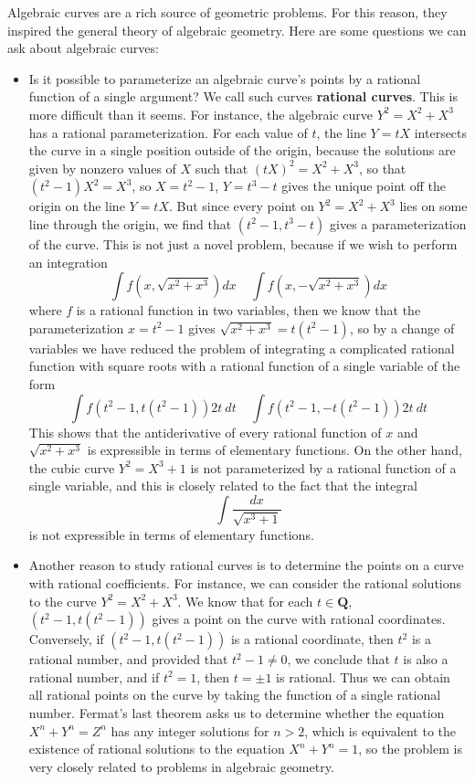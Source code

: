 Algebraic curves are a rich source of geometric problems. For this reason, they inspired the general theory of algebraic geometry. Here are some questions we can ask about algebraic curves:
%
\begin{itemize}
    \item Is it possible to parameterize an algebraic curve's points by a rational function of a single argument? We call such curves {\bf rational curves}. This is more difficult than it seems. For instance, the algebraic curve $Y^2 = X^2 + X^3$ has a rational parameterization. For each value of $t$, the line $Y = tX$ intersects the curve in a single position outside of the origin, because the solutions are given by nonzero values of $X$ such that $(tX)^2 = X^2 + X^3$, so that $(t^2 - 1)X^2 = X^3$, so $X = t^2 - 1$, $Y = t^3 - t$ gives the unique point off the origin on the line $Y = tX$. But since every point on $Y^2 = X^2 + X^3$ lies on some line through the origin, we find that $(t^2 - 1, t^3 - t)$ gives a parameterization of the curve. This is not just a novel problem, because if we wish to perform an integration
    \[ \int f \left(x, \sqrt{x^2 + x^3} \right) dx\ \ \ \ \ \int f \left( x, - \sqrt{x^2 + x^3} \right) dx \]
    where $f$ is a rational function in two variables, then we know that the parameterization $x = t^2 - 1$ gives $\sqrt{x^2 + x^3} = t(t^2-1)$, so by a change of variables we have reduced the problem of integrating a complicated rational function with square roots with a rational function of a single variable of the form
    \[ \int f(t^2 - 1, t(t^2 - 1)) 2t\ dt\ \ \ \ \ \int f(t^2 - 1, -t(t^2 - 1)) 2t\ dt \]
    This shows that the antiderivative of every rational function of $x$ and $\sqrt{x^2 + x^3}$ is expressible in terms of elementary functions. On the other hand, the cubic curve $Y^2 = X^3 + 1$ is not parameterized by a rational function of a single variable, and this is closely related to the fact that the integral
    \[ \int \frac{dx}{\sqrt{x^3 + 1}} \]
    is not expressible in terms of elementary functions.

    \item Another reason to study rational curves is to determine the points on a curve with rational coefficients. For instance, we can consider the rational solutions to the curve $Y^2 = X^2 + X^3$. We know that for each $t \in \mathbf{Q}$, $(t^2 - 1, t(t^2 - 1))$ gives a point on the curve with rational coordinates. Conversely, if $(t^2 - 1, t(t^2 - 1))$ is a rational coordinate, then $t^2$ is a rational number, and provided that $t^2 - 1 \neq 0$, we conclude that $t$ is also a rational number, and if $t^2 = 1$, then $t = \pm 1$ is rational. Thus we can obtain all rational points on the curve by taking the function of a single rational number. Fermat's last theorem asks us to determine whether the equation $X^n + Y^n = Z^n$ has any integer solutions for $n > 2$, which is equivalent to the existence of rational solutions to the equation $X^n + Y^n = 1$, so the problem is very closely related to problems in algebraic geometry.


\end{itemize}
